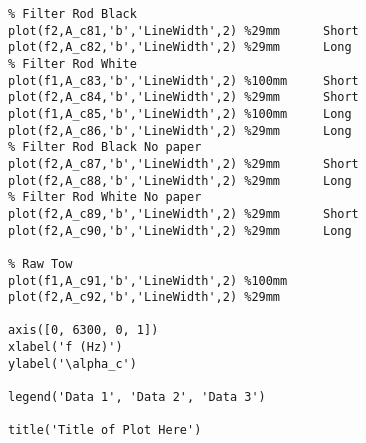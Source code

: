 \begin{verbatim}
% Filter Rod Black
plot(f2,A_c81,'b','LineWidth',2) %29mm      Short
plot(f2,A_c82,'b','LineWidth',2) %29mm      Long
% Filter Rod White
plot(f1,A_c83,'b','LineWidth',2) %100mm     Short
plot(f2,A_c84,'b','LineWidth',2) %29mm      Short
plot(f1,A_c85,'b','LineWidth',2) %100mm     Long
plot(f2,A_c86,'b','LineWidth',2) %29mm      Long
% Filter Rod Black No paper
plot(f2,A_c87,'b','LineWidth',2) %29mm      Short
plot(f2,A_c88,'b','LineWidth',2) %29mm      Long
% Filter Rod White No paper
plot(f2,A_c89,'b','LineWidth',2) %29mm      Short
plot(f2,A_c90,'b','LineWidth',2) %29mm      Long

% Raw Tow
plot(f1,A_c91,'b','LineWidth',2) %100mm
plot(f2,A_c92,'b','LineWidth',2) %29mm

axis([0, 6300, 0, 1])
xlabel('f (Hz)')
ylabel('\alpha_c')

legend('Data 1', 'Data 2', 'Data 3')

title('Title of Plot Here')

\end{verbatim}
